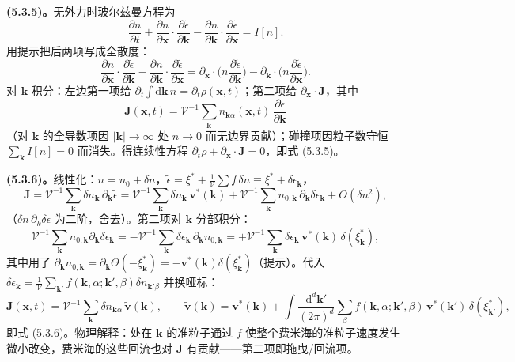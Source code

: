 \textbf{(5.3.5)。}无外力时玻尔兹曼方程为
\begin{equation*}
\frac{\partial n}{\partial t}
+\frac{\partial n}{\partial\pmb{x}}\cdot\frac{\partial\tilde\epsilon}{\partial\pmb{k}}
-\frac{\partial n}{\partial\pmb{k}}\cdot\frac{\partial\tilde\epsilon}{\partial\pmb{x}}=I[n] .
\end{equation*}
用提示把后两项写成全散度：
\begin{equation*}
\frac{\partial n}{\partial\pmb{x}}\cdot\frac{\partial\tilde\epsilon}{\partial\pmb{k}}
-\frac{\partial n}{\partial\pmb{k}}\cdot\frac{\partial\tilde\epsilon}{\partial\pmb{x}}
=\partial_{\pmb{x}}\cdot\Big(n\frac{\partial\tilde\epsilon}{\partial\pmb{k}}\Big)
-\partial_{\pmb{k}}\cdot\Big(n\frac{\partial\tilde\epsilon}{\partial\pmb{x}}\Big).
\end{equation*}
对 $\pmb{k}$ 积分：左边第一项给 $\partial_t\int\mathrm{d}\pmb{k}\,n=\partial_t\rho(\pmb{x},t)$；第二项给 $\partial_{\pmb{x}}\cdot\pmb{J}$，其中
\begin{equation*}
\pmb{J}(\pmb{x},t)=\mathcal{V}^{-1}\sum_{\pmb{k}}n_{\pmb{k}\alpha}(\pmb{x},t)\,\frac{\partial\tilde\epsilon}{\partial\pmb{k}}
\end{equation*}
（对 $\pmb{k}$ 的全导数项因 $|\pmb{k}|\to\infty$ 处 $n\to0$ 而无边界贡献）；碰撞项因粒子数守恒 $\sum_{\pmb{k}}I[n]=0$ 而消失。得连续性方程 $\partial_t\rho+\partial_{\pmb{x}}\cdot\pmb{J}=0$，即式 (5.3.5)。

\textbf{(5.3.6)。}线性化：$n=n_0+\delta n$，$\tilde\epsilon=\xi^{*}+\frac{1}{\mathcal V}\sum f\,\delta n\equiv\xi^{*}+\delta\epsilon_{\pmb{k}}$，
\begin{equation*}
\pmb{J}=\mathcal{V}^{-1}\sum_{\pmb{k}}\delta n_{\pmb{k}}\,\partial_{\pmb{k}}\tilde\epsilon
=\mathcal{V}^{-1}\sum_{\pmb{k}}\delta n_{\pmb{k}}\,\pmb{v}^{*}(\pmb{k})
+\mathcal{V}^{-1}\sum_{\pmb{k}}n_{0,\pmb{k}}\,\partial_{\pmb{k}}\delta\epsilon_{\pmb{k}}
+O(\delta n^{2}),
\end{equation*}
（$\delta n\,\partial_k\delta\epsilon$ 为二阶，舍去）。第二项对 $\pmb{k}$ 分部积分：
\begin{equation*}
\mathcal{V}^{-1}\sum_{\pmb{k}}n_{0,\pmb{k}}\partial_{\pmb{k}}\delta\epsilon_{\pmb{k}}
=-\mathcal{V}^{-1}\sum_{\pmb{k}}\delta\epsilon_{\pmb{k}}\,\partial_{\pmb{k}}n_{0,\pmb{k}}
=+\mathcal{V}^{-1}\sum_{\pmb{k}}\delta\epsilon_{\pmb{k}}\,\pmb{v}^{*}(\pmb{k})\,\delta(\xi^{*}_{\pmb{k}}),
\end{equation*}
其中用了 $\partial_{\pmb{k}}n_{0,\pmb{k}}=\partial_{\pmb{k}}\Theta(-\xi^{*}_{\pmb{k}})=-\pmb{v}^{*}(\pmb{k})\delta(\xi^{*}_{\pmb{k}})$（提示）。代入 $\delta\epsilon_{\pmb{k}}=\frac{1}{\mathcal V}\sum_{\pmb{k}'}f(\pmb{k},\alpha;\pmb{k}',\beta)\delta n_{\pmb{k}'\beta}$ 并换哑标：
\begin{equation*}
\pmb{J}(\pmb{x},t)=\mathcal{V}^{-1}\sum_{\pmb{k}}\delta n_{\pmb{k}\alpha}\,\tilde{\pmb{v}}(\pmb{k}),
\qquad
\tilde{\pmb{v}}(\pmb{k})=\pmb{v}^{*}(\pmb{k})
+\int\frac{\mathrm{d}^{d}\pmb{k}'}{(2\pi)^{d}}\sum_{\beta}f(\pmb{k},\alpha;\pmb{k}',\beta)\,\pmb{v}^{*}(\pmb{k}')\,\delta(\xi^{*}_{\pmb{k}'}) ,
\end{equation*}
即式 (5.3.6)。物理解释：处在 $\pmb{k}$ 的准粒子通过 $f$ 使整个费米海的准粒子速度发生微小改变，费米海的这些回流也对 $\pmb{J}$ 有贡献——第二项即拖曳/回流项。

